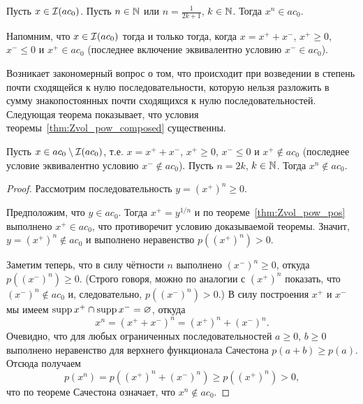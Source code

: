 \begin{theorem}
	\label{thm:Zvol_pow_composed}
	Пусть $x\in \mathcal{I}(ac_0)$.
	Пусть $n\in\mathbb{N}$ или $n = \frac1{2k+1}$, $k\in\mathbb{N}$.
	Тогда $x^n \in ac_0$.
\end{theorem}

Напомним, что $x\in \mathcal{I}(ac_0)$ тогда и только тогда, когда $x = x^+ +x^-$, $x^+\geq 0$, $x^- \leq 0$ и $x^+ \in ac_0$
(последнее включение эквивалентно условию $x^- \in ac_0$).

Возникает закономерный вопрос о том, что происходит при возведении в степень почти сходящейся к нулю последовательности,
которую нельзя разложить в сумму знакопостоянных почти сходящихся к нулю последовательностей.
Следующая теорема показывает, что условия теоремы~\ref{thm:Zvol_pow_composed} существенны.

\begin{proposition}
	\label{thm:ac0_pow_even}
	Пусть $x\in ac_0 \setminus \mathcal{I}(ac_0)$, т.е. $x = x^+ +x^-$, $x^+\geq 0$, $x^- \leq 0$ и $x^+ \notin ac_0$
	(последнее условие эквивалентно условию $x^- \notin ac_0$).
	Пусть $n = 2k$, $k\in\mathbb{N}$.
	Тогда $x^n \notin ac_0$.
\end{proposition}

\begin{proof}
	Рассмотрим последовательность $y = (x^+)^n \geq 0$.

	Предположим, что $y \in ac_0$.
	Тогда $x^+ = y^{1/n}$ и по теореме~\ref{thm:Zvol_pow_pos} выполнено $x^+\in ac_0$,
	что противоречит условию доказываемой теоремы.
	Значит, $y = (x^+)^n \notin ac_0$ и выполнено неравенство $p\left((x^+)^n\right) > 0$.

	Заметим теперь, что  в силу чётности $n$ выполнено $(x^-)^n \geq 0$, откуда $p\left((x^-)^n\right) \geq 0$.
	(Строго говоря, можно по аналогии с $(x^+)^n$ показать, что $(x^-)^n\notin ac_0$ и, следовательно, $p\left((x^-)^n\right) > 0$.)
	В силу построения $x^+$ и $x^-$ мы имеем $\operatorname{supp} x^+ \cap \operatorname{supp} x^- = \varnothing$,
	откуда
	\begin{equation}
		x^n = (x^+ + x^-)^n = (x^+)^n + (x^-)^n
		.
	\end{equation}
	Очевидно, что для любых ограниченных последовательностей $a\geq0$, $b\geq 0$ выполнено неравенство для верхнего функционала Сачестона $p(a+b) \geq p(a)$.
	Отсюда получаем
	\begin{equation}
		p(x^n) = p\left((x^+)^n + (x^-)^n\right) \geq p\left((x^+)^n\right) > 0
		,
	\end{equation}
	что по теореме Сачестона означает, что $x^n \notin ac_0$.
\end{proof}

